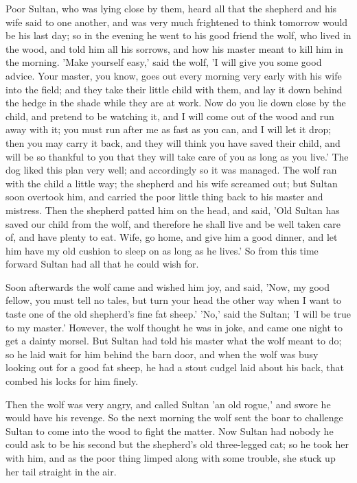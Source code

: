 \documentclass[12pt]{book}
\begin{document}
Poor Sultan, who was lying close by them, heard all that the shepherd
and his wife said to one another, and was very much frightened to
think tomorrow would be his last day; so in the evening he went to his
good friend the wolf, who lived in the wood, and told him all his
sorrows, and how his master meant to kill him in the morning. 'Make
yourself easy,' said the wolf, 'I will give you some good advice. Your
master, you know, goes out every morning very early with his wife into
the field; and they take their little child with them, and lay it down
behind the hedge in the shade while they are at work. Now do you lie
down close by the child, and pretend to be watching it, and I will
come out of the wood and run away with it; you must run after me as
fast as you can, and I will let it drop; then you may carry it back,
and they will think you have saved their child, and will be so
thankful to you that they will take care of you as long as you live.'
The dog liked this plan very well; and accordingly so it was managed.
The wolf ran with the child a little way; the shepherd and his wife
screamed out; but Sultan soon overtook him, and carried the poor
little thing back to his master and mistress. Then the shepherd patted
him on the head, and said, 'Old Sultan has saved our child from the
wolf, and therefore he shall live and be well taken care of, and have
plenty to eat. Wife, go home, and give him a good dinner, and let him
have my old cushion to sleep on as long as he lives.' So from this
time forward Sultan had all that he could wish for.

Soon afterwards the wolf came and wished him joy, and said, 'Now, my
good fellow, you must tell no tales, but turn your head the other way
when I want to taste one of the old shepherd's fine fat sheep.' 'No,'
said the Sultan; 'I will be true to my master.' However, the wolf
thought he was in joke, and came one night to get a dainty morsel. But
Sultan had told his master what the wolf meant to do; so he laid wait
for him behind the barn door, and when the wolf was busy looking out
for a good fat sheep, he had a stout cudgel laid about his back, that
combed his locks for him finely.

Then the wolf was very angry, and called Sultan 'an old rogue,' and
swore he would have his revenge. So the next morning the wolf sent the
boar to challenge Sultan to come into the wood to fight the matter.
Now Sultan had nobody he could ask to be his second but the shepherd's
old three-legged cat; so he took her with him, and as the poor thing
limped along with some trouble, she stuck up her tail straight in the
air.
\end{document}
